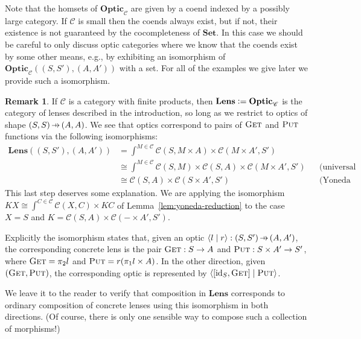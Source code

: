 \documentclass[11pt,letterpaper]{article}
\theoremstyle{plain}
\theoremstyle{definition}
\newtheorem{remark}[theorem]{Remark}
\newcommand{\C}{\mathscr{C}}
\newcommand{\Set}{\mathbf{Set}}
\newcommand{\Optic}{\mathbf{Optic}}
\newcommand{\Lens}{\mathbf{Lens}}
\newcommand{\id}{\mathrm{id}}
\newcommand{\defeq}{\mathrel{\vcentcolon=}}
\newcommand{\rep}[2]{{\ensuremath \left\langle #1 \mid #2 \right\rangle}}
\newcommand{\fget}{\textsc{Get}}
\newcommand{\fput}{\textsc{Put}}
\newcommand{\hto}{\ensuremath{\,\mathaccent\shortmid\rightarrow\,}}
\begin{document}
  Note that the homsets of $\Optic_\C$ are given by a coend indexed by a possibly large category. If $\C$ is small then the coends always exist, but if not, their existence is not guaranteed by the cocompleteness of $\Set$. In this case we should be careful to only discuss optic categories where we know that the coends exist by some other means, e.g., by exhibiting an isomorphism of $\Optic_\C((S, S'), (A, A'))$ with a set. For all of the examples we give later we provide such a isomorphism.

\begin{remark}
If $\C$ is a category with finite products, then $\Lens \defeq \Optic_\C$ is the category of lenses described in the introduction, so long as we restrict to optics of shape $(S, S) \hto (A, A)$. We see that optics correspond to pairs of $\fget$ and $\fput$ functions via the following isomorphisms:
\begin{align*}
  \Lens((S, S'), (A, A'))
  &= \int^{M \in \C} \C(S, M \times A) \times \C(M \times A', S') \\
  &\cong \int^{M \in \C} \C(S, M) \times \C(S, A) \times \C(M \times A', S') && \text{(universal property of product)} \\
  &\cong \C(S, A) \times \C(S \times A', S') && \text{(Yoneda reduction)}
\end{align*}
This last step deserves some explanation. We are applying the isomorphism $KX \cong \int^{C \in \C} \C(X,C) \times KC$ of Lemma~\ref{lem:yoneda-reduction} to the case $X = S$ and $K = \C(S, A) \times \C(- \times A', S')$.

Explicitly the isomorphism states that, given an optic $\rep{l}{r} : (S, S') \hto (A, A')$, the corresponding concrete lens is the pair $\fget : S \to A$ and $\fput : S \times A' \to S'$, where $\fget = \pi_2 l$ and $\fput = r (\pi_1 l \times A)$. In the other direction, given $(\fget, \fput)$, the corresponding optic is represented by $\rep{[\id_S, \fget]}{\fput}$.

We leave it to the reader to verify that composition in $\Lens$ corresponds to ordinary composition of concrete lenses using this isomorphism in both directions. (Of course, there is only one sensible way to compose such a collection of morphisms!)
\end{remark}

\end{document}
